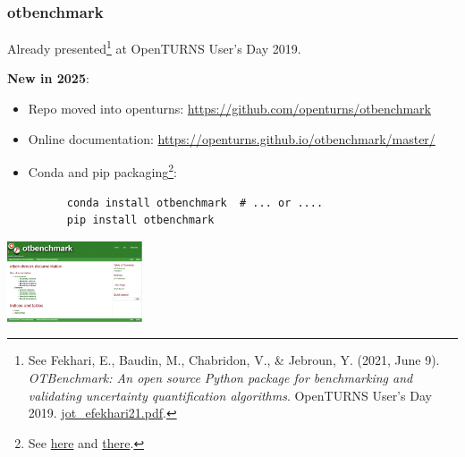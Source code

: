 \documentclass[aspectratio=169]{beamer}
\begin{document}
\begin{frame}[fragile]
  \frametitle{otbenchmark}

  Already presented\footnote{See Fekhari, E., Baudin, M., Chabridon, V., 
  \& Jebroun, Y. (2021, June 9). 
  \emph{OTBenchmark: An open source Python package for benchmarking and 
  validating uncertainty quantification algorithms}. 
  OpenTURNS User's Day 2019. 
  \href{https://github.com/openturns/presentation/blob/master/userday2021/jot_efekhari21.pdf}{jot\_efekhari21.pdf}.} at OpenTURNS User's Day 2019.

  \textbf{New in 2025}: 

  \begin{itemize}
    \item Repo moved into openturns: \url{https://github.com/openturns/otbenchmark}
    \item Online documentation: \url{https://openturns.github.io/otbenchmark/master/}
    \item Conda and pip packaging\footnote{See 
    \href{https://anaconda.org/conda-forge/otbenchmark}{here} and 
    \href{https://pypi.org/project/otbenchmark/}{there}.}:
    \begin{lstlisting}
      conda install otbenchmark  # ... or ....
      pip install otbenchmark
    \end{lstlisting}
  \end{itemize}

  \begin{center}
  \includegraphics[width=0.3\textwidth]{figures/otbenchmark-help.png}
  \end{center}
\end{frame}

\end{document}
